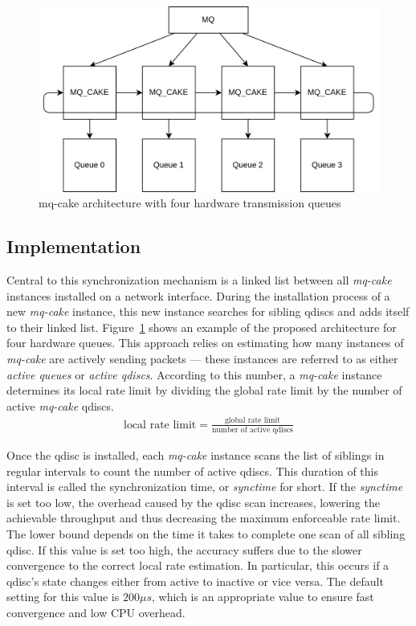 \begin{figure}[h]
    \centering
    \includegraphics[scale=0.15]{images/mq_cake_architecture.drawio.png}
    \caption{mq-cake architecture with four hardware transmission queues}\label{fig:mq_cake_architecture}
\end{figure}

\subsection{Implementation}
Central to this synchronization mechanism is a linked list between all \textit{mq-cake} instances installed on a network interface.
%
During the installation process of a new \textit{mq-cake} instance, this new instance searches for sibling qdiscs and adds itself to their linked list.
%
Figure~\ref{fig:mq_cake_architecture} shows an example of the proposed architecture for four hardware queues.
This approach relies on estimating how many instances of \textit{mq-cake} are actively sending packets --- these instances are referred to as either \textit{active queues} or \textit{active qdiscs}.
%
According to this number, a \textit{mq-cake} instance determines its local rate limit by dividing the global rate limit by the number of active \textit{mq-cake} qdiscs.
%
\begin{align}
    \text{local rate limit} = \frac{\text{global rate limit}}{\text{number of active qdiscs}}
\end{align} 

Once the qdisc is installed, each \textit{mq-cake} instance scans the list of siblings in regular intervals to count the number of active qdiscs. 
%
This duration of this interval is called the synchronization time, or \textit{synctime} for short.
%
If the \textit{synctime} is set too low, the overhead caused by the qdisc scan increases, lowering the achievable throughput and thus decreasing the maximum enforceable rate limit.
The lower bound depends on the time it takes to complete one scan of all sibling qdisc.
If this value is set too high, the accuracy suffers due to the slower convergence to the correct local rate estimation.
%
In particular, this occurs if a qdisc's state changes either from active to inactive or vice versa.
%
The default setting for this value is $200\mu s$, which is an appropriate value to ensure fast convergence and low CPU overhead. 
%


